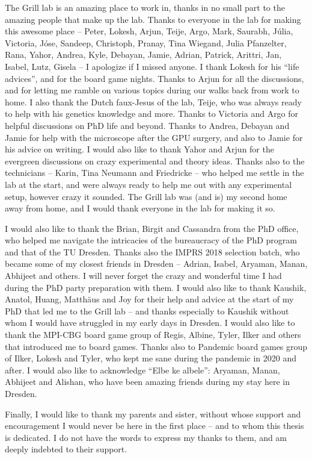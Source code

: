 The Grill lab is an amazing place to work in, thanks in no small part to the amazing people that make up the lab. Thanks to everyone in the lab for making this awesome place -- Peter, Lokesh, Arjun, Teije, Argo, Mark, Saurabh, J{\'u}lia, Victoria, J{\'o}se, Sandeep, Christoph, Pranay, Tina Wiegand, Julia Pfanzelter, Rana, Yahor, Andrea, Kyle, Debayan, Jamie, Adrian, Patrick, Arittri, Jan, Isabel, Lutz, Gisela -- I apologize if I missed anyone. I thank Lokesh for his \enquote{life advices}, and for the board game nights. Thanks to Arjun for all the discussions, and for letting me ramble on various topics during our walks back from work to home. I also thank the Dutch faux-Jesus of the lab, Teije, who was always ready to help with his genetics knowledge and more. Thanks to Victoria and Argo for helpful discussions on PhD life and beyond. Thanks to Andrea, Debayan and Jamie for help with the microscope after the GPU surgery, and also to Jamie for his advice on writing. I would also like to thank Yahor and Arjun for the evergreen discussions on crazy experimental and theory ideas. Thanks also to the technicians -- Karin, Tina Neumann and Friedricke -- who helped me settle in the lab at the start, and were always ready to help me out with any experimental setup, however crazy it sounded. The Grill lab was (and is) my second home away from home, and I would thank everyone in the lab for making it so. 

I would also like to thank the Brian, Birgit and Cassandra from the PhD office, who helped me navigate the intricacies of the bureaucracy of the PhD program and that of the TU Dresden. Thanks also the IMPRS 2018 selection batch, who became some of my closest friends in Dresden -- Adrian, Isabel, Aryaman, Manan, Abhijeet and others. I will never forget the crazy and wonderful time I had during the PhD party preparation with them. I would also like to thank Kaushik, Anatol, Huang, Matth{\"a}us and Joy for their help and advice at the start of my PhD that led me to the Grill lab -- and thanks especially to Kaushik without whom I would have struggled in my early days in Dresden. I would also like to thank the MPI-CBG board game group of Regis, Albine, Tyler, Ilker and others that introduced me to board games. Thanks also to Pandemic board games group of Ilker, Lokesh and Tyler, who kept me sane during the pandemic in 2020 and after. I would also like to acknowledge \enquote{Elbe ke albele}: Aryaman, Manan, Abhijeet and Alishan, who have been amazing friends during my stay here in Dresden.

Finally, I would like to thank my parents and sister, without whose support and encouragement I would never be here in the first place -- and to whom this thesis is dedicated. I do not have the words to express my thanks to them, and am deeply indebted to their support.